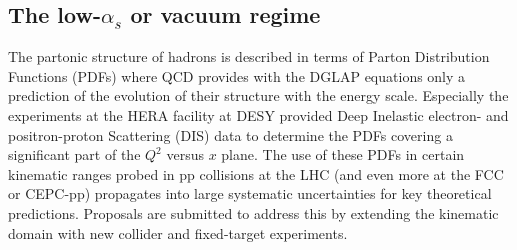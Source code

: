 \label{section_low}

\subsection{The low-$\alpha_s$ or vacuum regime}
The partonic structure of hadrons is described in terms of Parton Distribution
Functions (PDFs) where QCD provides with the DGLAP equations only a prediction of the evolution of their structure with the energy scale. Especially the experiments at the HERA facility at DESY provided Deep Inelastic electron- and positron-proton Scattering (DIS) data to determine the PDFs covering a significant part of the $Q^2$ versus $x$ plane.
%
The use of these PDFs in certain kinematic ranges probed in pp collisions at the
LHC (and even more at the FCC or CEPC-pp) propagates into large systematic uncertainties
for key theoretical predictions.
Proposals are submitted to address this by extending the kinematic domain with new collider and fixed-target experiments.
%

